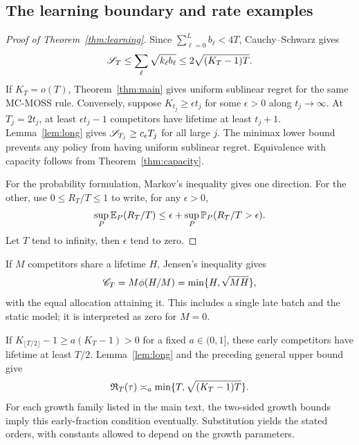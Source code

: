 \subsection{The learning boundary and rate examples}
\begin{proof}[Proof of Theorem~\ref{thm:learning}]
Since $\sum_{\ell=0}^L b_\ell<4T$, Cauchy--Schwarz gives
\[
 \mathscr S_T\le\sum_\ell\sqrt{k_\ell b_\ell}\le2\sqrt{(K_T-1)T}.
\]
If $K_T=o(T)$, Theorem~\ref{thm:main} gives uniform sublinear regret for the same MC-MOSS rule. Conversely, suppose $K_{t_j}\ge\epsilon t_j$ for some $\epsilon>0$ along $t_j\to\infty$. At $T_j=2t_j$, at least $\epsilon t_j-1$ competitors have lifetime at least $t_j+1$. Lemma~\ref{lem:long} gives $\mathscr S_{T_j}\ge c_\epsilon T_j$ for all large $j$. The minimax lower bound prevents any policy from having uniform sublinear regret. Equivalence with capacity follows from Theorem~\ref{thm:capacity}.

For the probability formulation, Markov's inequality gives one direction. For the other, use $0\le R_T/T\le1$ to write, for any $\epsilon>0$,
\[
 \sup_P\mathbb E_P(R_T/T)\le\epsilon+
 \sup_P\mathbb P_P(R_T/T>\epsilon).
\]
Let $T$ tend to infinity, then $\epsilon$ tend to zero.
\end{proof}

If $M$ competitors share a lifetime $H$, Jensen's inequality gives
\[
 \mathscr C_T=M\phi(H/M)=\min\{H,\sqrt{MH}\},
\]
with the equal allocation attaining it. This includes a single late batch and the static model; it is interpreted as zero for $M=0$.

If $K_{\lfloor T/2\rfloor}-1\ge a(K_T-1)>0$ for a fixed $a\in(0,1]$, these early competitors have lifetime at least $T/2$. Lemma~\ref{lem:long} and the preceding general upper bound give
\[
 \mathfrak R_T(\tau)\asymp_a\min\{T,\sqrt{(K_T-1)T}\}.
\]
For each growth family listed in the main text, the two-sided growth bounds imply this early-fraction condition eventually. Substitution yields the stated orders, with constants allowed to depend on the growth parameters.
